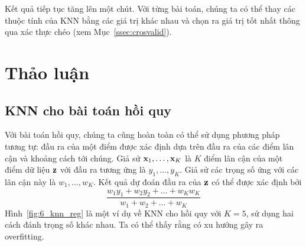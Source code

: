 Kết quả tiếp tục tăng lên một chút. Với từng bài toán, chúng ta có thể
thay các thuộc tính của KNN bằng các giá trị khác nhau và chọn ra giá trị tốt
nhất thông qua xác thực chéo (xem Mục~\ref{ssec:crosvalid}).




\section{Thảo luận}



\subsection{KNN cho bài toán hồi quy}
Với bài toán hồi quy, chúng ta cũng hoàn toàn có thể sử dụng phương pháp
tương tự: đầu ra của một điểm được xác định dựa trên đầu ra của các điểm lân cận
và khoảng cách tới chúng. Giả sử $\mathbf{x}_1, \dots, \mathbf{x}_K$ là $K$ điểm lân cận của
một điểm dữ liệu $\mathbf{z}$ với đầu ra tương ứng là $y_1, \dots, y_K$. Giả sử các
trọng số ứng với các lân cận này là $w_1, \dots, w_K$. Kết quả dự đoán
đầu ra của $\mathbf{z}$ có thể được xác định bởi
\begin{equation}
\displaystyle
\frac{w_1 y_1 + w_2 y_2 + \dots + w_Kw_K}{w_1 + w_2 + \dots + w_K}
\end{equation}
Hình~\ref{fig:6_knn_reg} là một ví dụ về KNN cho hồi quy với $K = 5$,
sử dụng hai cách đánh trọng số khác nhau. Ta có thể thấy rằng
 có xu hướng gây ra overfitting.


